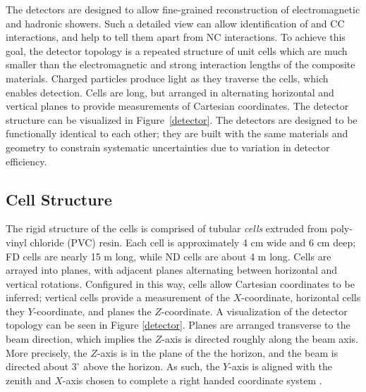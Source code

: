  The \nova detectors are designed to allow fine-grained reconstruction of electromagnetic and hadronic showers.
 Such a detailed view can allow identification of \numu and \nue CC
 interactions, and help to tell them apart from NC interactions.  To achieve this goal, the detector topology is a repeated structure of unit cells which are much smaller than the electromagnetic and strong interaction lengths of the composite materials.  Charged particles produce light as they traverse the cells, which enables detection.  Cells are long, but arranged in alternating horizontal and vertical planes to provide measurements of Cartesian coordinates.
The detector structure can be visualized in Figure~\ref{detector}.
The detectors are designed to be functionally identical to each other; they are built with the same materials and geometry to constrain systematic uncertainties due to variation in detector efficiency.



\subsection{Cell Structure}
\label{cell_section}
 The rigid structure of the cells is comprised of tubular \textit{cells} extruded from poly-vinyl chloride (PVC) resin.  Each cell is approximately 4 cm wide and 6 cm deep; FD cells are nearly 15 m long, while ND cells are about 4 m long.
 Cells are arrayed into planes, with adjacent planes alternating between horizontal and vertical rotations.
 Configured in this way, cells allow Cartesian coordinates to be inferred; vertical cells provide a measurement of the $X$-coordinate, horizontal cells they $Y$-coordinate, and planes the $Z$-coordinate.  A visualization of the detector topology can be seen in Figure \ref{detector}.
 Planes are arranged transverse to the beam direction, which implies the
 $Z$-axis is directed roughly along the beam axis.
 More precisely, the $Z$-axis is in the plane of the the horizon,
 and the beam is directed about $3^\circ$ above the horizon.
 As such, the $Y$-axis is aligned with the zenith and $X$-axis chosen to
 complete a right handed coordinate system \cite{tdr}.

